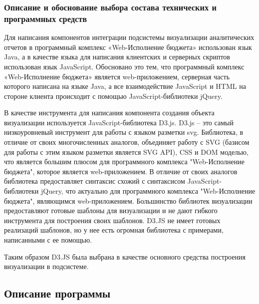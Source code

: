 \documentclass[a4paper]{extarticle}
\begin{document}
\subsubsection{Описание и обоснование выбора состава технических и программных средств}
Для написания компонентов интеграции подсистемы визуализации аналитических отчетов в программный комплекс «Web-Исполнение бюджета» использован язык Java, а в качестве языка для написания клиентских и серверных скриптов использован язык JavaScript. Обосновано это тем, что программный комплекс «Web-Исполнение бюджета» является web-приложением, серверная часть которого написана на языке Java, а все взаимодействие JavaScript и HTML на стороне клиента происходит с помощью JavaScript-библиотеки jQuery.\par
В качестве инструмента для написания компонента создания объекта визуализации используется JavaScript-библиотека D3.js. D3.js – это самый низкоуровневый инструмент для работы с языком разметки svg. Библиотека, в отличие от своих многочисленных аналогов, объединяет работу с SVG (базисом для работы с этим языком разметки является SVG API), CSS и DOM моделью, что является большим плюсом для программного комплекса "Web-Исполнение бюджета", которое является web-приложением. В отличие от своих аналогов библиотека предоставляет синтаксис схожий с синтаксисом JavaScript-библиотеки jQuery, что актуально для программного комплекса "Web-Исполнение бюджета", являющимся web-приложением. Большинство библиотек визуализации предоставляют готовые шаблоны для визуализации и не дают гибкого инструмента для построения своих шаблонов. D3.JS не имеет готовых реализаций шаблонов, но у нее есть огромная библиотека с примерами, написанными с ее помощью.\par
Таким образом D3.JS была выбрана в качестве основного средства построения визуализации в подсистеме.

\subsection{Описание программы}
\end{document}
